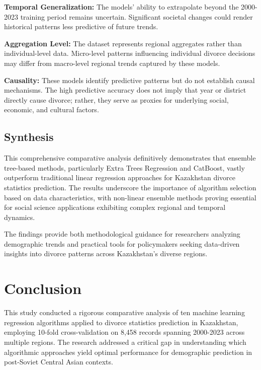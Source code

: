 \textbf{Temporal Generalization:} The models' ability to extrapolate beyond the 2000-2023 training period remains uncertain. Significant societal changes could render historical patterns less predictive of future trends.

\textbf{Aggregation Level:} The dataset represents regional aggregates rather than individual-level data. Micro-level patterns influencing individual divorce decisions may differ from macro-level regional trends captured by these models.

\textbf{Causality:} These models identify predictive patterns but do not establish causal mechanisms. The high predictive accuracy does not imply that year or district directly cause divorce; rather, they serve as proxies for underlying social, economic, and cultural factors.

\section{Synthesis}

This comprehensive comparative analysis definitively demonstrates that ensemble tree-based methods, particularly Extra Trees Regression and CatBoost, vastly outperform traditional linear regression approaches for Kazakhstan divorce statistics prediction. The results underscore the importance of algorithm selection based on data characteristics, with non-linear ensemble methods proving essential for social science applications exhibiting complex regional and temporal dynamics.

The findings provide both methodological guidance for researchers analyzing demographic trends and practical tools for policymakers seeking data-driven insights into divorce patterns across Kazakhstan's diverse regions.

\chapter{Conclusion}
\label{chap:conclusion}
\setlength{\parskip}{1em}

This study conducted a rigorous comparative analysis of ten machine learning regression algorithms applied to divorce statistics prediction in Kazakhstan, employing 10-fold cross-validation on 8,458 records spanning 2000-2023 across multiple regions. The research addressed a critical gap in understanding which algorithmic approaches yield optimal performance for demographic prediction in post-Soviet Central Asian contexts.


